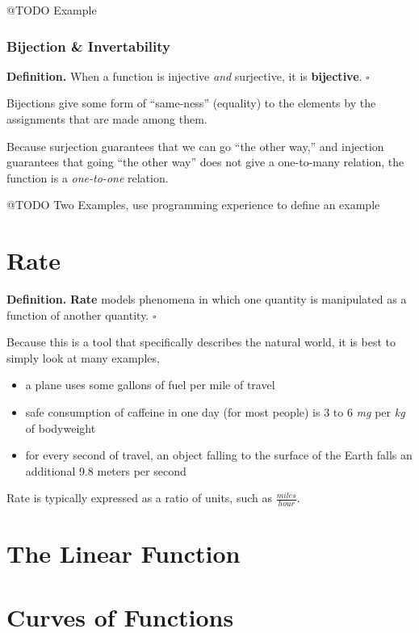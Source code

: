 \documentclass[letterpaper,twoside]{article}
\def\SmallHSpace{\hspace*{1mm}}
\newcommand{\DefinedTerm}[1]{\textbf{#1}}
\newcommand{\Definition}[1]{%
    \emoji{book} \textbf{Definition.}\SmallHSpace #1 \hfill $\square$
}
\newcommand{\Tldr}[1]{%
    \emoji{stopwatch} \textbf{Summary.}\SmallHSpace #1 \hfill $\square$
}
\newenvironment{SorrellItemize}
{
    \setlength\parskip{-5pt}
    \begin{itemize}[leftmargin=11pt]
        \setlength\itemsep{-4pt}
}{
    \end{itemize}
}
\begin{document}
\begin{multicols*}{2}
@TODO Example

\subsubsection{Bijection \& Invertability}

\Definition
{
    When a function is injective \textit{and} surjective, it is \DefinedTerm{bijective}.
}

Bijections give some form of ``same-ness'' (equality) to the elements by the assignments that are made among them.

Because surjection guarantees that we can go ``the other way,'' and injection guarantees that going ``the other way'' does not give a one-to-many relation, the function is a \textit{one-to-one} relation.

@TODO Two Examples, use programming experience to define an example

\section{Rate}

\Definition
{
    \DefinedTerm{Rate} models phenomena in which one quantity is manipulated as a function of another quantity.
}

Because this is a tool that specifically describes the natural world, it is best to simply look at many examples, 
\begin{SorrellItemize}
    \item a plane uses some gallons of fuel per mile of travel
    \item safe consumption of caffeine in one day (for most people) is 3 to 6 \textit{mg} per \textit{kg} of bodyweight
    \item for every second of travel, an object falling to the surface of the Earth falls an additional 9.8 meters per second
\end{SorrellItemize}

Rate is typically expressed as a ratio of units, such as $\frac{miles}{hour}$.

\section{The Linear Function}

\section{Curves of Functions}



\hfill{}
\end{multicols*}
\end{document}
